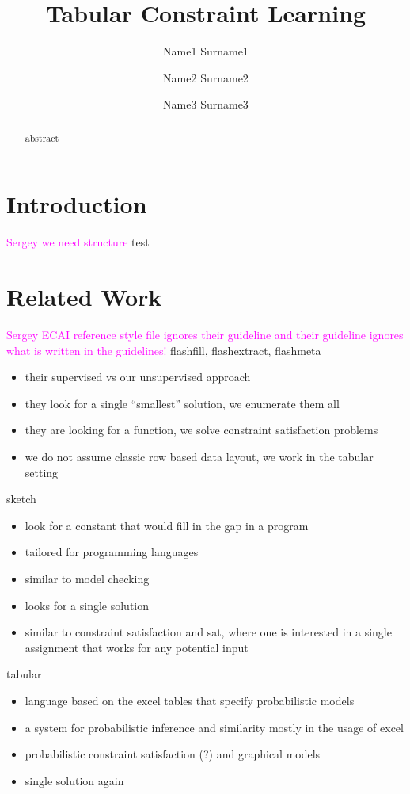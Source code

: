 \documentclass{ecai}
\newcommand{\sergey}[1]{\textcolor{magenta}{{\sc Sergey} #1}\xspace}
\begin{document}
\title{Tabular Constraint Learning}

\author{Name1 Surname1 \and Name2 Surname2 \and Name3 Surname3  }

\maketitle

\begin{abstract}
  abstract
  \end{abstract}
\section{Introduction}
\sergey{we need structure} test

\section{Related Work}
\sergey{ECAI reference style file ignores their guideline and their guideline ignores what is written in the guidelines!}
flashfill, flashextract, flashmeta \cite{flashfill,flashextract,flashmeta}
\begin{itemize}
  \item their supervised vs our unsupervised approach
  \item they look for a single ``smallest'' solution, we enumerate them all
  \item they are looking for a function, we solve constraint satisfaction problems
  \item we do not assume classic row based data layout, we work in the tabular setting
\end{itemize}

sketch \cite{sketch}
\begin{itemize}
  \item look for a constant that would fill in the gap in a program
  \item tailored for programming languages
  \item similar to model checking
  \item looks for a single solution
  \item similar to constraint satisfaction and sat, where one is interested in a single assignment that works for any potential input
\end{itemize}

tabular \cite{tabular}
\begin{itemize}
  \item language based on the excel tables that specify probabilistic models
  \item a system for probabilistic inference and similarity mostly in the usage of excel
  \item probabilistic constraint satisfaction (?) and graphical models
  \item single solution again
\end{itemize}
\end{document}
